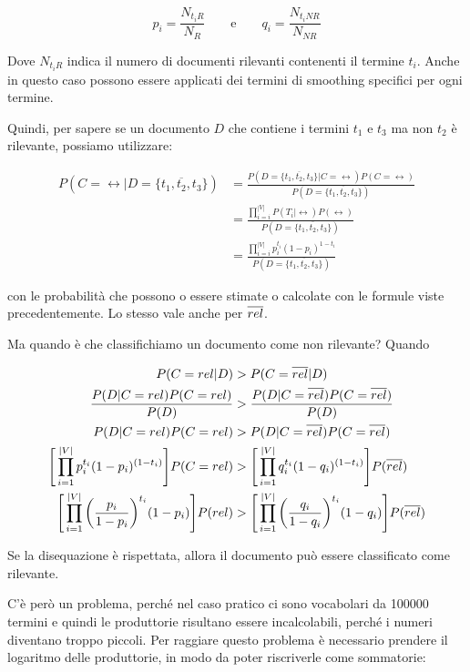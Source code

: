 $$
p_i = \frac{N_{t_iR}}{N_R} \qquad \text{e} \qquad q_i = \frac{N_{t_iNR}}{N_{NR}}
$$

\noindent Dove $N_{t_iR}$ indica il numero di documenti rilevanti contenenti il termine $t_i$. Anche in questo caso possono essere applicati dei termini di smoothing specifici per ogni termine.

Quindi, per sapere se un documento $D$ che contiene i termini $t_1$ e $t_3$ ma non $t_2$ è rilevante, possiamo utilizzare:

\begin{align*}
P(C=\rel | D=\{t_1, \overline{t_2}, t_3\}) &=\frac{ P( D=\{t_1, \overline{t_2}, t_3\} |C = \rel)P(C=\rel)}{P( D=\{t_1, \overline{t_2}, t_3\})} \\
                                           &=\frac{\prod\limits_{i=i}^{|V|} P(T_i | \rel)P(\rel) }{P( D=\{t_1, \overline{t_2}, t_3\})} \\
                                           &=\frac{\prod\limits_{i=i}^{|V|}p_{i}^{t_i}(1-p_i)^{1- t_i} }{P( D=\{t_1, \overline{t_2}, t_3\})}
\end{align*}

\noindent con le probabilità che possono o essere stimate o calcolate con le formule viste precedentemente. Lo stesso vale anche per $\overline{rel}$.

Ma quando è che classifichiamo un documento come non rilevante? Quando

\begin{align*}
									                        P(C=rel|D) &> P(C=\overline{rel} |D) \\
									\frac{P(D | C=rel)P(C=rel)}{P(D)} &> \frac{P(D | C=\overline{rel})P(C=\overline{rel})}{P(D)} \\
									             P(D | C=rel)P(C=rel) &> P(D | C=\overline{rel})P(C=\overline{rel}) \\
			\Bigg[\prod\limits_{i=1}^{|V|} p_{i}^{t_i} (1 - p_{i})^{(1-t_i)}\Bigg] P(C = rel) &> \Bigg[\prod\limits_{i=1}^{|V|} q_{i}^{t_i} (1 - q_{i})^{(1-t_i)}\Bigg]P(\overline{rel}) \\
  \Bigg[\prod\limits_{i=1}^{|V|} \bigg(\frac{ p_{i} }{1-p_i}\bigg)^{t_i} (1-p_i)\Bigg] P(rel) &>\Bigg[\prod\limits_{i=1}^{|V|} \bigg(\frac{ q_{i} }{1-q_i}\bigg)^{t_i} (1-q_i)\Bigg] P(\overline{rel})
\end{align*}

\noindent Se la disequazione è rispettata, allora il documento può essere classificato come rilevante.

C'è però un problema, perché nel caso pratico ci sono vocabolari da 100000 termini e quindi le produttorie risultano essere incalcolabili, perché i numeri diventano troppo piccoli.
Per raggiare questo problema è necessario prendere il logaritmo delle produttorie, in modo da poter riscriverle come sommatorie:

